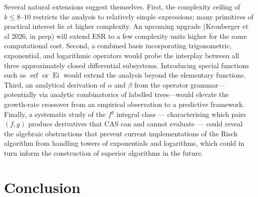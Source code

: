 \documentclass[preprint,12pt,authoryear]{elsarticle}
\newcommand{\hd}[1]{{\color{red}\textbf{[HD: #1]}}}
\begin{document}

Several natural extensions suggest themselves. First, the complexity ceiling of $k \leq 8$--$10$ restricts the analysis to relatively simple expressions; many primitives of practical interest lie at higher complexity. An upcoming upgrade (Kronberger et al 2026, in prep) will extend ESR to a few complexity units higher for the same computational cost. Second, a combined basis incorporating trigonometric, exponential, and logarithmic operators would probe the interplay between all three approximately closed differential subsystems. Introducing special functions such as $\operatorname{erf}$ or $\operatorname{Ei}$ would extend the analysis beyond the elementary functions. Third, an analytical derivation of $\alpha$ and $\beta$ from the operator grammar---potentially via analytic combinatorics \citep{FlajoletSedgewick2009} of labelled trees---would elevate the growth-rate crossover from an empirical observation to a predictive framework.
Finally, a systematic study of the $f^g$ integral class --- characterising which pairs $(f, g)$ produce derivatives that CAS can and cannot evaluate --- could reveal the algebraic obstructions that prevent current implementations of the Risch algorithm from handling towers of exponentials and logarithms, which could in turn inform the construction of superior algorithms in the future.

\section{Conclusion}
\label{sec:conclusion}
\end{document}
